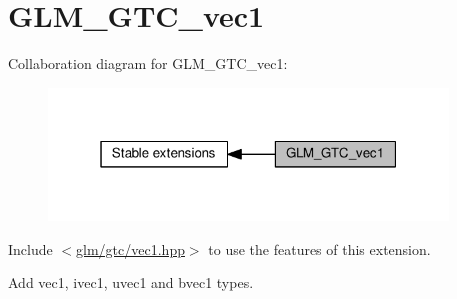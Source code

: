 \hypertarget{group__gtc__vec1}{}\section{G\+L\+M\+\_\+\+G\+T\+C\+\_\+vec1}
\label{group__gtc__vec1}
Collaboration diagram for G\+L\+M\+\_\+\+G\+T\+C\+\_\+vec1\+:
\nopagebreak
\begin{figure}[H]
\begin{center}
\leavevmode
\includegraphics[width=301pt]{d4/d69/group__gtc__vec1}
\end{center}
\end{figure}
Include $<$\hyperlink{gtc_2vec1_8hpp}{glm/gtc/vec1.\+hpp}$>$ to use the features of this extension.

Add vec1, ivec1, uvec1 and bvec1 types. 